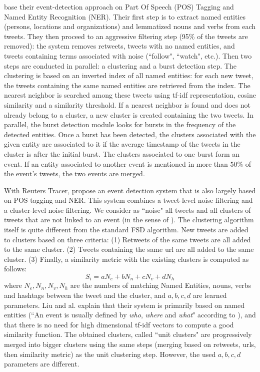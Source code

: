 \citet{mcminn_real_2015} base their event-detection approach on Part Of Speech (POS) Tagging and Named Entity Recognition (NER). Their first step is to extract named entities (persons, locations and organizations) and lemmatized nouns and verbs from each tweets. They then proceed to an aggressive filtering step (95\% of the tweets are removed): the system removes retweets, tweets with no named entities, and tweets containing terms associated with noise (``follow", ``watch", etc.). Then two steps are conducted in parallel: a clustering and a burst detection step. The clustering is based on an inverted index of all named entities: for each new tweet, the tweets containing the same named entities are retrieved from the index. The nearest neighbor is searched among these tweets using tf-idf representation, cosine similarity and a similarity threshold. If a nearest neighbor is found and does not already belong to a cluster, a new cluster is created containing the two tweets. In parallel, the burst detection module looks for bursts in the frequency of the detected entities. Once a burst has been detected, the clusters associated with the given entity are associated to it if the average timestamp of the tweets in the cluster is after the initial burst. The clusters associated to one burst form an event. If an entity associated to another event is mentioned in more than 50\% of the event's tweets, the two events are merged.

With Reuters Tracer, \citet{liu_reuters_2016} propose an event detection system that is also largely based on POS tagging and NER. This system combines a tweet-level noise filtering and a cluster-level noise filtering. We consider as ``noise" all tweets and all clusters of tweets that are not linked to an event (in the sense of \citet{mcminn_building_2013}). The clustering algorithm itself is quite different from the standard FSD algorithm. New tweets are added to clusters based on three criteria: (1) Retweets of the same tweets are all added to the same cluster. (2) Tweets containing the same url are all added to the same cluster. (3) Finally, a similarity metric with the existing clusters is computed as follows:
$$
S_i = aN_e + bN_n + cN_v + dN_h
$$
where $N_e,N_n,N_v,N_h$ are the numbers of matching Named Entities, nouns, verbs and hashtags between the tweet and the cluster, and $a, b, c, d$ are learned parameters. Liu and al. explain that their system is primarily based on named entities (``An event is usually defined by \textit{who}, \textit{where} and \textit{what}" according to \citet{mcminn_building_2013}), and that there is no need for high dimensional tf-idf vectors to compute a good similarity function. The obtained clusters, called ``unit clusters" are progressively merged into bigger clusters using the same steps (merging based on retweets, urls, then similarity metric) as the unit clustering step. However, the used $a, b, c, d$ parameters are different.

